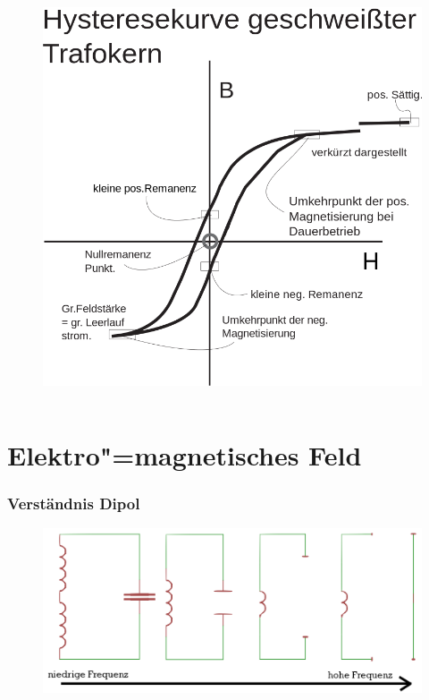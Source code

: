 \begin{frame}
\begin{columns}[t]
\begin{center}
\begin{figure}
        \includegraphics[width=1\textwidth,height=.6\textheight,keepaspectratio]{a08/Soft_hysteresis_welded.png}
      \end{figure}
    \end{center}
  \end{columns}
\end{frame}

\section*{Elektro"=magnetisches Feld}

\begin{frame}
  \frametitle{Verständnis Dipol}
  \begin{center}
    \begin{figure}
      \includegraphics[width=1\textwidth,height=.85\textheight,keepaspectratio]{a08/dipol_entstehung.png}
    \end{figure}
  \end{center}
\end{frame}

